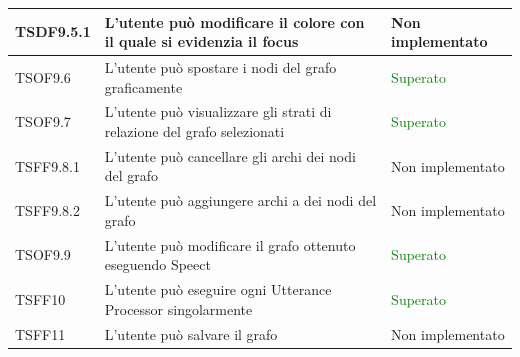 \documentclass[openany,12pt,a4paper]{report}
\begin{document}
\begin{longtable}{| p{2cm} |p{8cm} | p{2.5cm} |}
	\newline TSDF9.5.1&
	\newline L'utente può modificare il colore con il quale si evidenzia il focus&
	\newline Non implementato
	\\[1em]
	\hline
	
	\newline TSOF9.6&
	\newline L'utente può spostare i nodi del grafo graficamente&
	\newline \textcolor{green}{Superato}
	\\[1em]
	\hline
	
	\newline TSOF9.7&
	\newline L'utente può visualizzare gli strati di relazione del grafo selezionati&
	\newline \textcolor{green}{Superato}
	\\[1em]
	\hline
	
	\newline TSFF9.8.1&
	\newline L'utente può cancellare gli archi dei nodi del grafo&
	\newline Non implementato
	\\[1em]
	\hline
	
	\newline TSFF9.8.2&
	\newline L'utente può aggiungere archi a dei nodi del grafo&
	\newline Non implementato
	\\[1em]
	\hline
	
	\newline TSOF9.9&
	\newline L'utente può modificare il grafo ottenuto eseguendo Speect&
	\newline \textcolor{green}{Superato}
	\\[1em]
	\hline	
	
	\newline TSFF10&
	\newline L'utente può eseguire ogni Utterance Processor singolarmente&
	\newline \textcolor{green}{Superato}
	\\[1em]
	\hline
	
	
	\newline TSFF11&
	\newline L'utente può salvare il grafo&
	\newline Non implementato
	\\[1em]
	\hline
	

\end{longtable}
\end{document}

